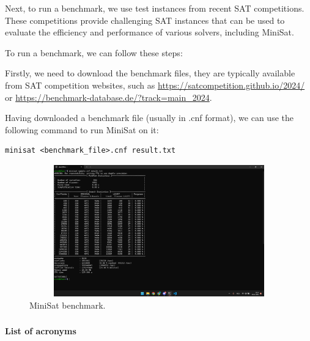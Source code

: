 \documentclass[runningheads]{llncs}
\begin{document}
Next, to run a benchmark, we use test instances from recent SAT competitions. These competitions provide challenging SAT instances that can be used to evaluate the efficiency and performance of various solvers, including MiniSat.

To run a benchmark, we can follow these steps:

Firstly, we need to download the benchmark files, they are typically available from SAT competition websites, such as \url{https://satcompetition.github.io/2024/} or \url{https://benchmark-database.de/?track=main_2024}.

Having downloaded a benchmark file (usually in .cnf format), we can use the following command to run MiniSat on it: \begin{verbatim}
minisat <benchmark_file>.cnf result.txt
\end{verbatim}

\begin{figure}
\centering
\includegraphics[width=12cm, height=5.7cm]{fig2.png}
\caption{MiniSat benchmark.} 
\label{fig2}
\end{figure}
\newpage

\begin{credits}
\subsubsection{\ackname} 

\subsubsection{\discintname}

\end{credits}
%
%
%
% 
% 
%
\newpage
{\noindent \huge \listoffigures \par}
{\noindent \huge \textbf{List of acronyms}\par}
\end{document}

